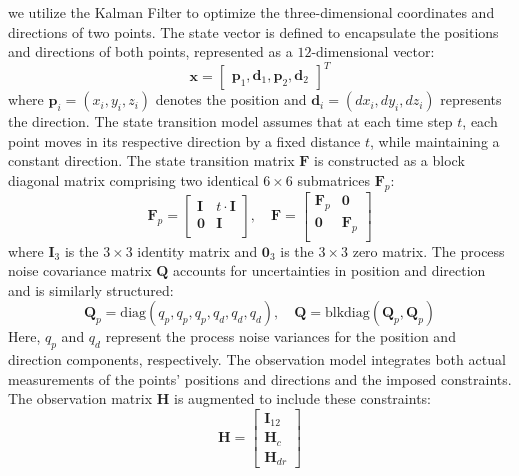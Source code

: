 we utilize the Kalman Filter to optimize the three-dimensional coordinates and directions of two points. The state vector is defined to encapsulate the positions and directions of both points, represented as a $12$-dimensional vector:
\begin{equation}
\mathbf{x} = \begin{bmatrix}
    \mathbf p_1,\mathbf d_1,\mathbf p_2,\mathbf d_2 
\end{bmatrix}^T
\end{equation}
where $\mathbf p_i=\left(x_i, y_i, z_i\right)$ denotes the position 
and $\mathbf d_i=\left(dx_i, dy_i, dz_i\right)$ represents the direction.
The state transition model assumes that at each time step $t$, each point moves in its respective direction by a fixed distance $t$, while maintaining a constant direction. The state transition matrix $\mathbf{F}$ is constructed as a block diagonal matrix comprising two identical $6 \times 6$ submatrices $\mathbf{F}_p$:
\begin{equation}
\mathbf{F}_p = \begin{bmatrix}
\mathbf{I} & t \cdot \mathbf{I} \\
\mathbf{0} & \mathbf{I} \\
\end{bmatrix}, \quad
\mathbf{F} = \begin{bmatrix}
\mathbf{F}_p & \mathbf{0} \\
\mathbf{0} & \mathbf{F}_p \\
\end{bmatrix}
\end{equation}
where $\mathbf{I}_3$ is the $3 \times 3$ identity matrix and $\mathbf{0}_3$ is the $3 \times 3$ zero matrix. The process noise covariance matrix $\mathbf{Q}$ accounts for uncertainties in position and direction and is similarly structured:
\begin{equation}
\mathbf{Q}_p = \text{diag}(q_p, q_p, q_p, q_d, q_d, q_d), \quad \mathbf{Q} = \text{blkdiag}(\mathbf{Q}_p, \mathbf{Q}_p)
\end{equation}
Here, $q_p$ and $q_d$ represent the process noise variances for the position and direction components, respectively.
The observation model integrates both actual measurements of the points' positions and directions and the imposed constraints. The observation matrix $\mathbf{H}$ is augmented to include these constraints:
\begin{equation}
\mathbf{H} = \begin{bmatrix}
\mathbf{I}_{12} \\
\mathbf{H}_c \\
\mathbf{H}_{dr}
\end{bmatrix}
\end{equation}

